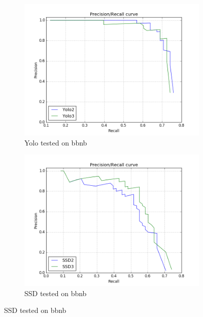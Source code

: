 \begin{figure}[h!]
\begin{subfigure}{.5\textwidth}
  \centering
  \includegraphics[width=0.8\linewidth]{results/case_buildings/prec_recall/yolo/bb.png}
  \caption{Yolo tested on bbnb}
  \label{fig:sfig1}
\end{subfigure}%
\begin{subfigure}{.5\textwidth}
  \centering
  \includegraphics[width=.8\linewidth]{results/case_buildings/prec_recall/ssd/bb.png}
  \caption{SSD tested on bbnb}
  \label{fig:sfig2}
\end{subfigure}


\end{figure}
